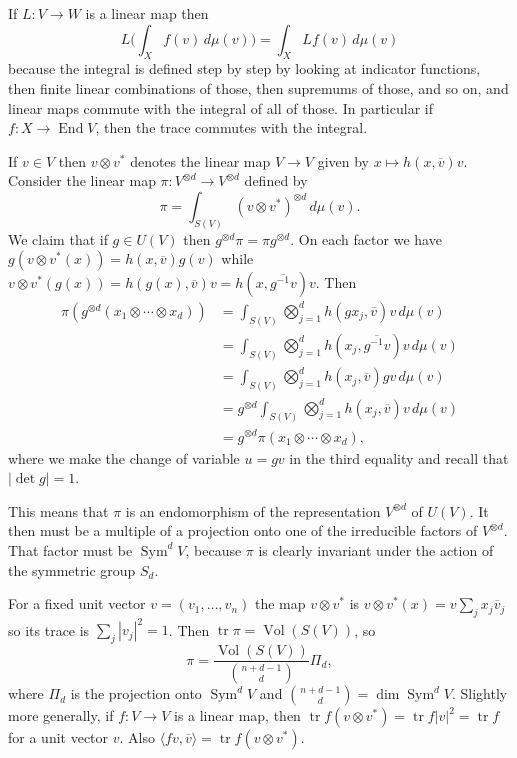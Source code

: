 \documentclass[11pt]{amsart}
\theoremstyle{definition}
\def\ov#1{\overline{#1}}
\DeclareMathOperator{\Vol}{Vol}
\DeclareMathOperator{\End}{End}
\DeclareMathOperator{\Sym}{Sym}
\DeclareMathOperator{\tr}{tr}
\begin{document}
If $L : V \to W$ is a linear map then
$$
L \biggl( \int_X f(v) \, d\mu(v) \biggr)
= \int_X L f(v) \, d\mu(v)
$$
because the integral is defined step by step by looking at indicator functions,
then finite linear combinations of those, then supremums of those, and so on,
and linear maps commute with the integral of all of those.
In particular if $f : X \to \End V$, then the trace commutes with the integral.

If $v \in V$ then $v \otimes v^*$ denotes the linear map $V \to V$ given by $x
\mapsto h(x, \ov v) v$.
Consider the linear map $\pi : V^{\otimes d} \to V^{\otimes d}$ defined by
$$
\pi = \int_{S(V)} (v \otimes v^*)^{\otimes d} \, d\mu(v).
$$
We claim that if $g \in U(V)$ then $g^{\otimes d} \pi = \pi g^{\otimes d}$.
On each factor we have $g(v\otimes v^*(x)) = h(x,\ov v) g(v)$
while $v \otimes v^*(g(x)) = h(g(x), \ov v) v = h(x, \ov{g^{-1}v}) v$.
Then
\begin{align*}
\pi(g^{\otimes d}(x_1 \otimes \cdots \otimes x_d))
&= \int_{S(V)} \bigotimes_{j=1}^d h(g x_j, \ov v) v \, d\mu(v)
\\
&= \int_{S(V)} \bigotimes_{j=1}^d h(x_j, \ov{g^{-1}v}) v \, d\mu(v)
\\
&= \int_{S(V)} \bigotimes_{j=1}^d h(x_j, \ov{v}) g v \, d\mu(v)
\\
&= g^{\otimes d} \int_{S(V)} \bigotimes_{j=1}^d h(x_j, \ov{v}) v \, d\mu(v)
\\
&= g^{\otimes d} \pi(x_1 \otimes \cdots \otimes x_d),
\end{align*}
where we make the change of variable $u = gv$ in the third equality and recall
that $|\!\det g| = 1$.

This means that $\pi$ is an endomorphism of the representation $V^{\otimes d}$
of $U(V)$.
It then must be a multiple of a projection onto one of the irreducible factors
of $V^{\otimes d}$.
That factor must be $\Sym^d V$, because $\pi$ is clearly invariant under the
action of the symmetric group $S_d$.

For a fixed unit vector $v = (v_1,\ldots,v_n)$ the map $v \otimes v^*$
is $v \otimes v^*(x) = v \sum_j x_j \ov v_j$ so its trace is $\sum_j |v_j|^2 = 1$.
Then $\tr \pi = \Vol(S(V))$, so
$$
\pi = \frac{\Vol(S(V))}{\binom{n+d-1}{d}} \Pi_d,
$$
where $\Pi_d$ is the projection onto $\Sym^d V$ and $\binom{n+d-1}{d} = \dim
\Sym^d V$.
Slightly more generally, if $f : V \to V$ is a linear map, then
$\tr f (v \otimes v^*) = \tr f |v|^2 = \tr f$ for a unit vector $v$.
Also
$\langle f v, \ov v \rangle = \tr f (v \otimes v^*)$.
\end{document}
